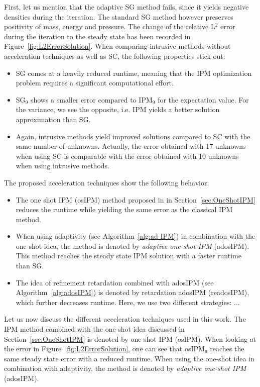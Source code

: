 First, let us mention that the adaptive SG method fails, since it yields negative densities during the iteration. The standard SG method however preserves positivity of mass, energy and pressure. The change of the relative L$^2$ error during the iteration to the steady state has been recorded in Figure~\ref{fig:L2ErrorSolution}. When comparing intrusive methods without acceleration techniques as well as SC, the following properties stick out:
\begin{itemize}
\item SG comes at a heavily reduced runtime, meaning that the IPM optimization problem requires a significant computational effort.
\item SG$_9$ shows a smaller error compared to IPM$_9$ for the expectation value. For the variance, we see the opposite, i.e. IPM yields a better solution approximation than SG.
\item Again, intrusive methods yield improved solutions compared to SC with the same number of unknowns. Actually, the error obtained with 17 unknowns when using SC is comparable with the error obtained with 10 unknowns when using intrusive methods.
\end{itemize}
The proposed acceleration techniques show the following behavior:
\begin{itemize}
\item The one shot IPM (osIPM) method proposed in in Section~\ref{sec:OneShotIPM} reduces the runtime while yielding the same error as the classical IPM method.
\item When using adaptivity (see Algorithm~\ref{alg:ad-IPM}) in combination with the one-shot idea, the method is denoted by \textit{adaptive one-shot IPM} (adosIPM). This method reaches the steady state IPM solution with a faster runtime than SG.
\item The idea of refinement retardation combined with adosIPM (see Algorithm~\ref{alg:adosIPM}) is denoted by retardation adosIPM (readosIPM), which further decreases runtime. Here, we use two different strategies: ...
\end{itemize}


Let us now discuss the different acceleration techniques used in this work. The IPM method combined with the one-shot idea discussed in Section~\ref{sec:OneShotIPM} is denoted by one-shot IPM (osIPM). When looking at the error in Figure~\ref{fig:L2ErrorSolution}, one can see that osIPM$_9$ reaches the same steady state error with a reduced runtime. When using the one-shot idea in combination with adaptivity, the method is denoted by \textit{adaptive one-shot IPM} (adosIPM). 







